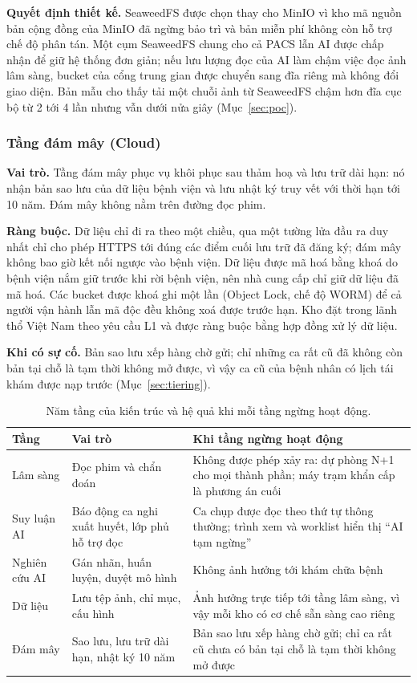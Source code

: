 \textbf{Quyết định thiết kế.} SeaweedFS được chọn thay cho MinIO vì kho mã nguồn bản
cộng đồng của MinIO đã ngừng bảo trì và bản miễn phí không còn hỗ trợ chế độ phân tán.
Một cụm SeaweedFS chung cho cả PACS lẫn AI được chấp nhận để giữ hệ thống đơn giản;
nếu lưu lượng đọc của AI làm chậm việc đọc ảnh lâm sàng, bucket của cổng trung gian
được chuyển sang đĩa riêng mà không đổi giao diện. Bản mẫu cho thấy tải một chuỗi ảnh
từ SeaweedFS chậm hơn đĩa cục bộ từ 2 tới 4 lần nhưng vẫn dưới nửa giây
(Mục~\ref{sec:poc}).

\subsubsection{Tầng đám mây (Cloud)}

\textbf{Vai trò.} Tầng đám mây phục vụ khôi phục sau thảm hoạ và lưu trữ dài hạn: nó
nhận bản sao lưu của dữ liệu bệnh viện và lưu nhật ký truy vết với thời hạn tới 10
năm. Đám mây không nằm trên đường đọc phim.

\textbf{Ràng buộc.} Dữ liệu chỉ đi ra theo một chiều, qua một tường lửa đầu ra duy
nhất chỉ cho phép HTTPS tới đúng các điểm cuối lưu trữ đã đăng ký; đám mây không bao
giờ kết nối ngược vào bệnh viện. Dữ liệu được mã hoá bằng khoá do bệnh viện nắm giữ
trước khi rời bệnh viện, nên nhà cung cấp chỉ giữ dữ liệu đã mã hoá. Các bucket được
khoá ghi một lần (Object Lock, chế độ WORM) để cả người vận hành lẫn mã độc đều không
xoá được trước hạn. Kho đặt trong lãnh thổ Việt Nam theo yêu cầu L1 và được ràng buộc
bằng hợp đồng xử lý dữ liệu.

\textbf{Khi có sự cố.} Bản sao lưu xếp hàng chờ gửi; chỉ những ca rất cũ đã không còn
bản tại chỗ là tạm thời không mở được, vì vậy ca cũ của bệnh nhân có lịch tái khám được
nạp trước (Mục~\ref{sec:tiering}).

\begin{table}[H]
\centering
\small
\begin{tabularx}{\textwidth}{@{}l Y Y@{}}
\toprule
\textbf{Tầng} & \textbf{Vai trò} & \textbf{Khi tầng ngừng hoạt động} \\
\midrule
Lâm sàng & Đọc phim và chẩn đoán & Không được phép xảy ra: dự phòng N+1 cho mọi thành phần; máy trạm khẩn cấp là phương án cuối \\
Suy luận AI & Báo động ca nghi xuất huyết, lớp phủ hỗ trợ đọc & Ca chụp được đọc theo thứ tự thông thường; trình xem và worklist hiển thị ``AI tạm ngừng'' \\
Nghiên cứu AI & Gán nhãn, huấn luyện, duyệt mô hình & Không ảnh hưởng tới khám chữa bệnh \\
Dữ liệu & Lưu tệp ảnh, chỉ mục, cấu hình & Ảnh hưởng trực tiếp tới tầng lâm sàng, vì vậy mỗi kho có cơ chế sẵn sàng cao riêng \\
Đám mây & Sao lưu, lưu trữ dài hạn, nhật ký 10 năm & Bản sao lưu xếp hàng chờ gửi; chỉ ca rất cũ chưa có bản tại chỗ là tạm thời không mở được \\
\bottomrule
\end{tabularx}
\caption{Năm tầng của kiến trúc và hệ quả khi mỗi tầng ngừng hoạt động.}
\label{tab:layers}
\end{table}

